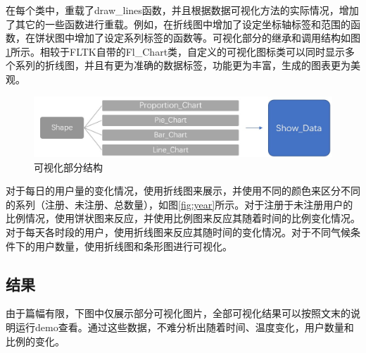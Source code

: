\documentclass[CJK]{ctexart}
\begin{document}
    在每个类中，重载了draw\_lines函数，并且根据数据可视化方法的实际情况，增加了其它的一些函数进行重载。例如，在折线图中增加了设定坐标轴标签和范围的函数，在饼状图中增加了设定系列标签的函数等。可视化部分的继承和调用结构如图\ref{fig:struct_vision}所示。相较于FLTK自带的Fl\_Chart类，自定义的可视化图标类可以同时显示多个系列的折线图，并且有更为准确的数据标签，功能更为丰富，生成的图表更为美观。\par

    \begin{figure}[htbp]
        \centering
        \includegraphics[width=5in]{img/struct_1.jpg}
        \caption{可视化部分结构}
        \label{fig:struct_vision}
    \end{figure}

    对于每日的用户量的变化情况，使用折线图来展示，并使用不同的颜色来区分不同的系列（注册、未注册、总数量），如图\ref{fig:year}所示。对于注册于未注册用户的比例情况，使用饼状图来反应，并使用比例图来反应其随着时间的比例变化情况。对于每天各时段的用户，使用折线图来反应其随时间的变化情况。对于不同气候条件下的用户数量，使用折线图和条形图进行可视化。
    
\subsection{结果}
    由于篇幅有限，下图中仅展示部分可视化图片，全部可视化结果可以按照文末的说明运行demo查看。通过这些数据，不难分析出随着时间、温度变化，用户数量和比例的变化。
    
\end{document}
